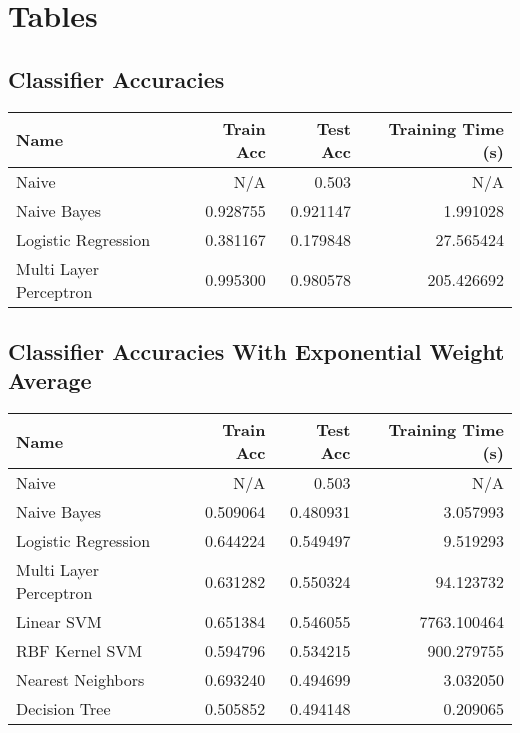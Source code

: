 \documentclass[10pt, oneside]{article}   	%
\begin{document}
\section*{Tables}


\subsection*{Classifier Accuracies}
\begin{tabular}{lrrr}
\toprule
                   Name &  Train Acc &  Test Acc &  Training Time (s) \\
\midrule
                  Naive &        N/A &       0.503 &                N/A \\
            Naive Bayes &   0.928755 &  0.921147 &           1.991028 \\
    Logistic Regression &   0.381167 &  0.179848 &          27.565424 \\
 Multi Layer Perceptron &   0.995300 &  0.980578 &         205.426692 \\
\bottomrule
\end{tabular}




\subsection*{Classifier Accuracies With Exponential Weight Average}

\begin{tabular}{lrrr}
\toprule
                   Name &  Train Acc &  Test Acc &  Training Time (s) \\
\midrule
                  Naive &        N/A &       0.503 &                N/A \\
            Naive Bayes &   0.509064 &  0.480931 &           3.057993 \\
    Logistic Regression &   0.644224 &  0.549497 &           9.519293 \\
 Multi Layer Perceptron &   0.631282 &  0.550324 &          94.123732 \\
             Linear SVM &   0.651384 &  0.546055 &        7763.100464 \\
         RBF Kernel SVM &   0.594796 &  0.534215 &         900.279755 \\
      Nearest Neighbors &   0.693240 &  0.494699 &           3.032050 \\
          Decision Tree &   0.505852 &  0.494148 &           0.209065 \\
\bottomrule
\end{tabular}
\end{document}
